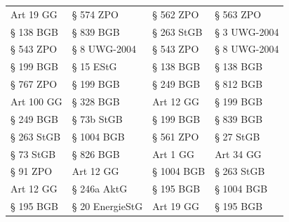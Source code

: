 \begin{tabular}{llll}
 Art 19 GG &            § 574 ZPO &  § 562 ZPO &               § 563 ZPO \\
 § 138 BGB &            § 839 BGB & § 263 StGB &            § 3 UWG-2004 \\
 § 543 ZPO &         § 8 UWG-2004 &  § 543 ZPO &            § 8 UWG-2004 \\
 § 199 BGB &            § 15 EStG &  § 138 BGB &               § 138 BGB \\
 § 767 ZPO &            § 199 BGB &  § 249 BGB &               § 812 BGB \\
Art 100 GG &            § 328 BGB &  Art 12 GG &               § 199 BGB \\
 § 249 BGB &           § 73b StGB &  § 199 BGB &               § 839 BGB \\
§ 263 StGB &           § 1004 BGB &  § 561 ZPO &               § 27 StGB \\
 § 73 StGB &            § 826 BGB &   Art 1 GG &               Art 34 GG \\
  § 91 ZPO &            Art 12 GG & § 1004 BGB &              § 263 StGB \\
 Art 12 GG &          § 246a AktG &  § 195 BGB &              § 1004 BGB \\
 § 195 BGB &      § 20 EnergieStG &  Art 19 GG &               § 195 BGB \\
\bottomrule
\end{tabular}

